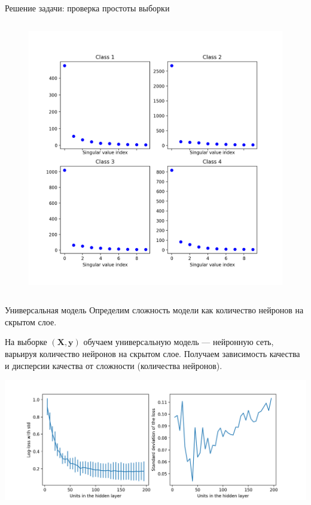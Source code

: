 \documentclass{beamer}
\newcommand{\by}{\mathbf{y}}
\newcommand{\bX}{\mathbf{X}}
\begin{document}
\begin{frame}{Решение задачи: проверка простоты выборки}
\begin{columns}[T]
\begin{column}{.48\textwidth}
    \begin{figure}[ht]
        \centering
          \includegraphics[width=\textwidth]{../pics/sv_analysis.png}
    \end{figure}

        \end{column}%
    \end{columns}
\end{frame}


\begin{frame}{Универсальная модель}
    Определим сложность модели как количество нейронов на скрытом слое.

    На выборке $(\bX, \by)$ обучаем универсальную модель — нейронную сеть,
    варьируя количество нейронов на скрытом слое. Получаем зависимость
    качества и дисперсии качества от сложности (количества нейронов).
    \begin{center}
        \includegraphics[width=\textwidth]{../pics/loss_and_std_of_n_units_reg.png}
    \end{center}
\end{frame}
\end{document}
